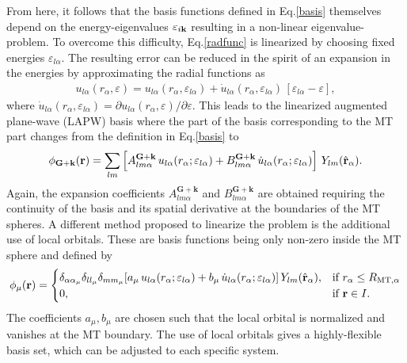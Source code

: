   From here, it follows that the basis functions defined in Eq.\;\eqref{basis} themselves depend on the energy-eigenvalues $\varepsilon_{i\mathbf{k}}$ resulting in a non-linear eigenvalue-problem. To overcome this difficulty, Eq.\;\eqref{radfunc} is linearized by choosing  fixed energies $\varepsilon_{l\alpha}$. The resulting error can be reduced  in the spirit of an expansion in the energies by approximating  the radial functions as
  \begin{align}
    u_{l\alpha}(r_\alpha,\varepsilon) = u_{l\alpha}(r_\alpha,\varepsilon_{l\alpha}) + \Dot{u}_{l\alpha}(r_\alpha,\varepsilon_{l\alpha})\,[\varepsilon_{l\alpha} - \varepsilon],
  \end{align}
  where $\Dot{u}_{l\alpha}(r_\alpha,\varepsilon_{l\alpha})=\partial u_{l\alpha}(r_\alpha,\varepsilon) /\partial\varepsilon$.
%
This leads to  the linearized augmented plane-wave (LAPW) basis where the part of the basis corresponding to the MT part changes from the definition in Eq.\;\eqref{basis} to 
  \begin{align}
      \phi_\mathbf{G+k}(\mathbf{r}) =  \sum\limits_{lm}\left[A^{\mathbf{G+k}}_{lm\alpha}\,u_{l\alpha}(r_\alpha;\varepsilon_{l\alpha}) + B^{\mathbf{G+k}}_{lm\alpha}\,\dot{u}_{l\alpha}(r_\alpha;\varepsilon_{l\alpha}) \right]\,Y_{lm}(\hat{\mathbf{r}}_\alpha). 
  \end{align}
 Again, the expansion coefficients $A^{\mathbf{G+k}}_{lm\alpha}$ and $B^{\mathbf{G+k}}_{lm\alpha}$ are obtained requiring the continuity of the basis and its spatial derivative at the boundaries of the MT spheres.  A different method proposed to linearize the problem is the additional use of local orbitals\cite{apw+lo}. These are basis functions being only non-zero inside the MT sphere and defined by 
 \begin{align}
    \phi_\mu(\mathbf{r}) = \begin{cases}
      \delta_{\alpha\alpha_\mu}\delta_{ll_\mu}\delta_{mm_\mu}[a_\mu \,u_{l\alpha}(r_\alpha;\varepsilon_{l\alpha}) +b_\mu\, \dot{u}_{l\alpha}(r_\alpha;\varepsilon_{l\alpha})]\,Y_{lm}(\hat{\mathbf{r}}_\alpha), & \text{if } r_\alpha \leq R_{\text{MT},\alpha} \\
      0, & \text{if }  \mathbf{r} \in I.
      \end{cases}
  \end{align}
  The coefficients $a_\mu, b_\mu$ are chosen such that the local orbital is normalized and vanishes at the MT boundary. The use of local orbitals gives a highly-flexible basis set, which can be adjusted to each specific system. 

